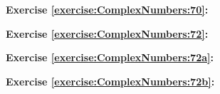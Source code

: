 \noindent\textbf{Exercise \ref{exercise:ComplexNumbers:70}:}

\noindent\textbf{Exercise \ref{exercise:ComplexNumbers:72}:}

\noindent\textbf{Exercise \ref{exercise:ComplexNumbers:72a}:}

\noindent\textbf{Exercise \ref{exercise:ComplexNumbers:72b}:}

%
%
%
%
%
%
%
%
%
%
